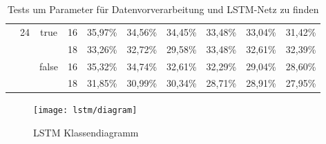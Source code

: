 \begin{sidewaystable*}
\begin{tabular}{|c|c|c|c|c|c|c|c|c|c|}
  &\multirow{4}{*}{24}&\multirow{2}{*}{true}&16&35,97\%&34,56\%&34,45\%&33,48\%&33,04\%&31,42\%\\\cline{4-10}
  & & &18&33,26\%&32,72\%&29,58\%&33,48\%&32,61\%&32,39\%\\\cline{3-10}
  & &\multirow{2}{*}{false}&16&35,32\%&34,74\%&32,61\%&32,29\%&29,04\%&28,60\%\\\cline{4-10}
  & & &18&31,85\%&30,99\%&30,34\%&28,71\%&28,91\%&27,95\%\\
\hline
\end{tabular} 
\caption[Tests für Daten und LSTM-Netz]{Tests um Parameter für Datenvorverarbeitung und LSTM-Netz zu finden}
\label{tab:inputtests}
\end{sidewaystable*}

\begin{figure*}[htfp]
  \begin{center}
  \texttt{[image: lstm/diagram]}
  \caption[\acs{LSTM} Klassendiagramm]{\acs{LSTM} Klassendiagramm}
  \label{fig:lstm_class}
  \end{center}
\end{figure*}  